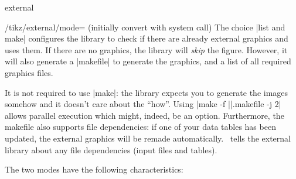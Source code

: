 \begin{pgfplotslibrary}{external}
\begin{key}{/tikz/external/mode= (initially convert with system call)}
	The choice |list and make| configures the library to check if there are already external graphics and uses them. If there are no graphics, the library will \emph{skip} the figure. However, it will also generate a |makefile| to generate the graphics, and a list of all required graphics files.

	It is not required to use |make|: the library expects you to generate the images somehow and it doesn't care about the ``how''. Using |make -f ||.makefile -j 2| allows parallel execution which might, indeed, be an option. Furthermore, the makefile also supports file dependencies: if one of your data tables has been updated, the external graphics will be remade automatically. \PGFPlots\ tells the external library about any file dependencies (input files and tables).

	The two modes have the following characteristics:
\end{key}


\end{pgfplotslibrary}
